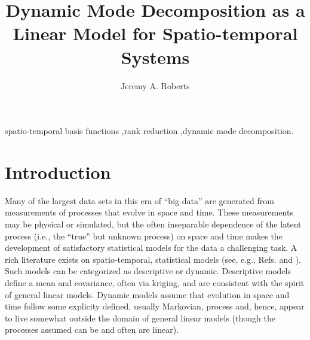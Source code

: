 \documentclass[review,number,sort&compress,12pt]{elsarticle}
\begin{document}
\begin{frontmatter}

\title{Dynamic Mode Decomposition as a Linear Model for Spatio-temporal Systems}

\author{Jeremy A. Roberts}
\address{Department of Statistics, Kansas State University, Manhattan, KS 66506, USA}

\begin{abstract}

\end{abstract}

\begin{keyword}
 spatio-temporal basis functions \sep rank reduction \sep dynamic mode decomposition.
\end{keyword}
\end{frontmatter}

\ifDRAFT
\linenumbers
\fi

\section{Introduction}
\label{sec:introduction}

Many of the largest data sets in this era of ``big data'' are generated from measurements of processes that evolve in space and time.
These measurements may be physical or simulated, but the often inseparable dependence of the latent process (i.e., the ``true'' but unknown process) on space and time makes the development of satisfactory statistical models for the data a challenging task.
A rich literature exists on spatio-temporal, statistical models (see, e.g., Refs. \cite{cressie2011sst} and \cite{wikle2019sts}).
Such models can be categorized as descriptive or dynamic.  
Descriptive models define a mean and covariance, often via kriging, and are consistent with the spirit of general linear models.  
Dynamic models assume that evolution in space and time follow some explicity defined, usually Markovian, process and, hence, appear to live somewhat outside the domain of general linear models (though the processes assumed can be and often are linear).
\end{document}

